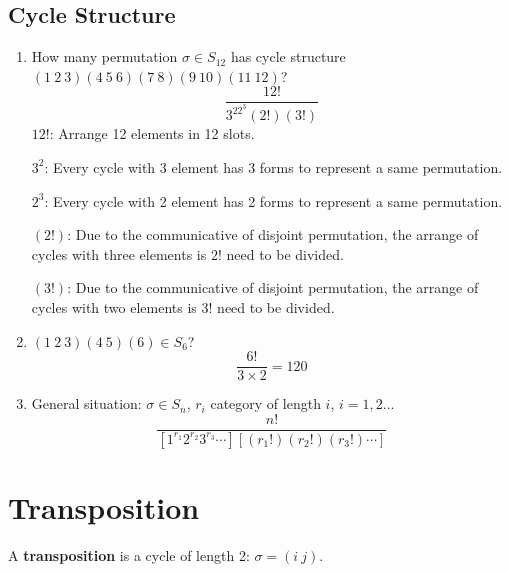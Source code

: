 \documentclass[11pt]{elegantbook}
\begin{document}
\subsection{Cycle Structure}
\begin{enumerate}[$\bullet$]
    \item How many permutation $\sigma\in S_{12}$ has cycle structure $(1\ 2\ 3)(4\ 5\ 6)(7\ 8)(9\ 10)(11\ 12)$?
    $$\frac{12!}{3^22^3(2!)(3!)}$$
    $12!$: Arrange 12 elements in 12 slots.

    $3^2$: Every cycle with 3 element has 3 forms to represent a same permutation.

    $2^3$: Every cycle with 2 element has 2 forms to represent a same permutation.

    $(2!)$: Due to the communicative of disjoint permutation, the arrange of cycles with three elements is $2!$ need to be divided.

    $(3!)$: Due to the communicative of disjoint permutation, the arrange of cycles with two elements is $3!$ need to be divided.
    \item $(1\ 2\ 3)(4\ 5)(6)\in S_6$?
    $$\frac{6!}{3\times 2}=120$$
    \item General situation: $\sigma\in S_n$, $r_i$ category of length $i$, $i=1,2...$
    $$\frac{n!}{[1^{r_1}2^{r_2}3^{r_3}\cdots][(r_1!)(r_2!)(r_3!)\cdots]}$$
\end{enumerate}


\section{Transposition}
\begin{definition}
A \textbf{transposition} is a cycle of length 2: $\sigma=(i\ j)$.
\end{definition}
\end{document}
